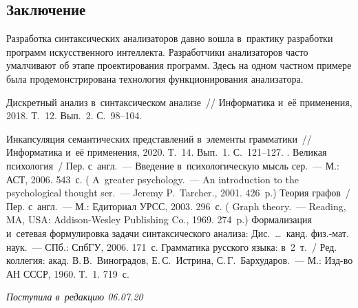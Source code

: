 \begin{multicols}{2}
\section{Заключение}

  Разработка синтаксических анализаторов давно вошла в~прак\-ти\-ку 
разработки программ искусственного интеллекта. Разработчики 
анализаторов час\-то умалчивают об этапе проектирования программ. Здесь 
на одном част\-ном примере была продемонстрирована технология 
функционирования ана\-ли\-за\-тора.
  
{\small\frenchspacing
 {%
 \begin{thebibliography}{9}
 Дискретный анализ в~синтаксическом 
анализе~// Информатика и~её применения, 2018. Т.~12. Вып.~2. С.~98--104.

 Инкапсуляция семантических пред\-став\-ле\-ний 
в~элементы грамматики~// Информатика и~её применения, 2020. Т.~14. Вып.~1.  
С.~121--127.
.
Великая психология~/ Пер. с~англ.~--- Введение в~психологическую мысль сер.~--- М.: 
АСТ, 2006. 543~с.
(  A~greater psychology.~--- An introduction to the psychological thought ser.~---
 Jeremy P.~Tarcher., 2001. 426~p.)
 Тео\-рия графов~/ Пер. с~англ.~--- М.: Едиториал УРСС, 2003. 296~с.
( {Graph theory}.~--- Reading, MA, USA: Addison-Wesley 
Publishing Co., 1969. 274~p.)
 Формализация и~сетевая формулировка задачи синтаксического 
анализа: Дис.\ \ldots\ канд. физ.-мат. наук.~--- СПб.: СпбГУ, 2006. 171~с.
Грамматика русского языка: в~2~т.~/ Ред. коллегия: акад. В.\,В.~Виноградов,
Е.\,С.~Истрина, С.\,Г.~Бархударов.~--- 
М.: Изд-во АН СССР, 1960. Т.~1. 719~с.

\end{thebibliography}

 }
 }

\end{multicols}

\vspace*{-6pt}

\hfill{\small\textit{Поступила в~редакцию 06.07.20}}

\vspace*{8pt}


